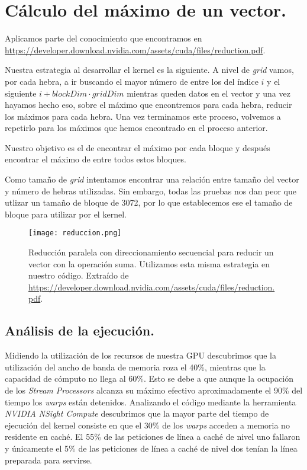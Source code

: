 \section{Cálculo del máximo de un vector.}

Aplicamos parte del conocimiento que encontramos en \url{https://developer.download.nvidia.com/assets/cuda/files/reduction.pdf}.

Nuestra estrategia al desarrollar el kernel es la siguiente.
A nivel de \textit{grid} vamos, por cada hebra, a ir buscando
el mayor número de entre los del índice $i$ y el siguiente
$i+blockDim\cdot gridDim$ mientras queden datos en el vector y una
vez hayamos hecho eso, sobre el máximo que encontremos para cada hebra,
reducir los máximos para cada hebra. Una vez terminamos este proceso,
volvemos a repetirlo para los máximos que hemos encontrado en el proceso
anterior.

Nuestro objetivo es el de encontrar el máximo por cada bloque y
después encontrar el máximo de entre todos estos bloques.

Como tamaño de \textit{grid} intentamos encontrar una relación entre tamaño del vector y
número de hebras utilizadas. Sin embargo, todas las pruebas nos dan peor que utlizar un tamaño
de bloque de 3072, por lo que establecemos ese el tamaño de bloque para utilizar por el kernel.

\begin{figure}[H]
    \centering
    \texttt{[image: reduccion.png]}
    \caption{Reducción paralela con direccionamiento secuencial para reducir un vector con la operación suma.
        Utilizamos esta misma estrategia en nuestro código.
        Extraído de \url{https://developer.download.nvidia.com/assets/cuda/files/reduction.pdf}.}
\end{figure}

\subsection{Análisis de la ejecución.}

Midiendo la utilización de los recursos de nuestra GPU descubrimos que la utilización del ancho de banda de memoria roza el
40\%, mientras que la capacidad de cómputo no llega al 60\%. Esto se debe a que aunque la ocupación de los \textit{Stream Processors}
alcanza su máximo efectivo aproximadamente el 90\% del tiempo los \textit{warps} están detenidos.
Analizando el código mediante la herramienta \textit{NVIDIA NSight Compute} descubrimos que la mayor parte del tiempo de ejecución
del kernel consiste en que el 30\% de los \textit{warps} acceden a memoria no residente en caché. El 55\% de las peticiones
de línea a caché de nivel uno fallaron y únicamente el 5\% de las peticiones de línea a caché de nivel dos tenían la línea preparada
para servirse.


